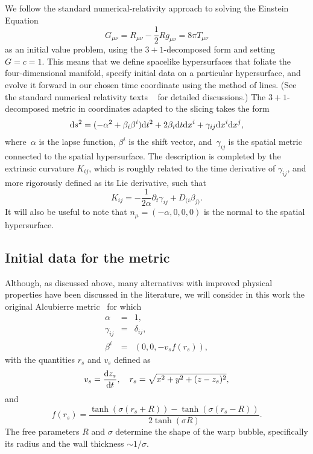 \documentclass[twocolumn, numberedappendix, twocolappendix,apj, iop, a4paper]{openjournal}
\begin{document}
We follow the standard numerical-relativity approach to solving the Einstein Equation
\begin{equation}
  G_{\mu \nu}= R_{\mu \nu} - \frac{1}{2} R g_{\mu \nu} = 8 \pi T_ {\mu \nu} 
  \label{eq:fieldeq}
\end{equation} 
as an initial value problem, using the $3+1$-decomposed form and setting $G=c=1$. This means that we define spacelike hypersurfaces that foliate the four-dimensional manifold, specify initial data on a particular hypersurface, and evolve it forward in our chosen time coordinate using the method of lines. 
(See the standard numerical relativity texts ~\citep{Arnotwitt:1960,York:1979,Alcubierre:2008co} for detailed discussions.)
The $3+1$-decomposed metric in coordinates adapted to the slicing takes the form
\begin{equation}
  {\rm d} s^2 = (-\alpha^2 + \beta_i \beta^i) {\rm d} t^2 + 2 \beta_i {\rm d}t {\rm d}x^i + 
  \gamma_{ij} {\rm d}x^i {\rm d}x^j,
\end{equation} 
where~$\alpha$ is the lapse function, $\beta^i$ is the shift vector, 
and~$\gamma_{ij}$ is the spatial metric connected to the spatial hypersurface. The description is completed by the extrinsic curvature $K_{ij}$, which is roughly related to the time derivative of $\gamma_{ij}$, and more rigorously defined as its Lie derivative, such that
\begin{equation}
K_{ij} = - \frac{1}{2 \alpha} \partial_t \gamma_{ij} + D_{(i} \beta_{j)}.
\label{eq:ext_curv}
\end{equation}
It will also be useful to note that $n_\mu = (-\alpha, 0,0,0)$ is the normal to the spatial hypersurface.

\subsection{Initial data for the metric}

Although, as discussed above, many alternatives with improved physical properties have been discussed in the literature, we will consider in this work the original Alcubierre metric~\citep{Alcubierre:1994tu} for which
\begin{eqnarray}
 \alpha      & = & 1, \\
 \gamma_{ij} & = & \delta_{ij}, \\
 \beta^i     & = & \left(0, 0, -v_s f(r_s)\right), 
\end{eqnarray}
with the quantities $r_s$ and $v_s$ defined as
\begin{equation}
 v_s  =  \frac{{\rm d}z_s}{{\rm d}t}, \quad
 r_s  = \sqrt{x^2+y^2+(z-z_s)^2},
\end{equation}
and 
\begin{equation}
 f(r_s) = \frac{\tanh(\sigma (r_s +R) )-\tanh(\sigma (r_s -R) )}{2 \tanh(\sigma R)}.
\end{equation}
The free parameters $R$ and $\sigma$ determine the shape of the warp bubble, specifically its radius and the wall thickness $\sim 1/\sigma$. 
\end{document}
